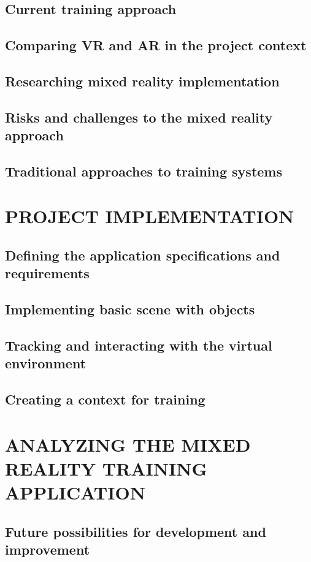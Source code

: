 \documentclass[12pt, a4paper,oneside, nocenter]{thesis}
\begin{document}
\section{Current training approach}

\section{Comparing VR and AR in the project context}
\section{Researching mixed reality implementation}
\section{Risks and challenges to the mixed reality approach}
\section{Traditional approaches to training systems}
\par
\chapter{\MakeUppercase{Project implementation}}
\section{Defining the application specifications and requirements}
\section{Implementing basic scene with objects}
\section{Tracking and interacting with the virtual environment}
\section{Creating a context for training}

\par
\chapter{\MakeUppercase{Analyzing the mixed reality training application}}

\section{Future possibilities for development and improvement}


\newpage

\nocite{*}

\end{document}
